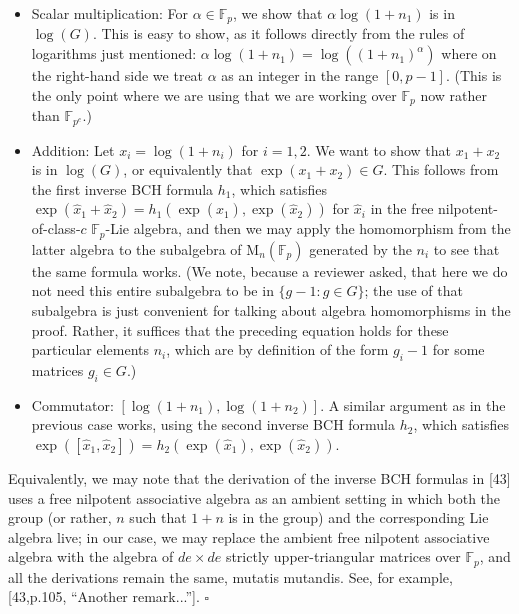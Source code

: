 \documentclass[10pt,a4paper]{article}
\begin{document}
\begin{itemize}
\item Scalar multiplication: For $\alpha\in\mathbb F_p$, we show that $\alpha\log(1+n_1)$ is in $\log(G)$. This is easy to show, as it follows directly from the rules of logarithms just mentioned: $\alpha\log(1+n_1)=\log((1+n_1)^\alpha)$ where on the right-hand side we treat $\alpha$ as an integer in the range $[0,p-1]$. (This is the only point where we are using that we are working over $\mathbb F_p$ now rather than $\mathbb F_{p^e}$.)
\item Addition: Let $x_i=\log(1+n_i)$ for $i=1,2$. We want to show that $x_1+x_2$ is in $\log(G)$, or equivalently that $\exp(x_1+x_2)\in G$. This follows from the first inverse BCH formula $h_1$, which satisfies $\exp(\hat x_1+\hat x_2)=h_1(\exp(\hat x_1),\exp(\hat x_2))$ for $\hat x_i$ in the free nilpotent-of-class-$c$ $\mathbb F_p$-Lie algebra, and then we may apply the homomorphism from the latter algebra to the subalgebra of $\mathrm M_n(\mathbb F_p)$ generated by the $n_i$ to see that the same formula works. (We note, because a reviewer asked, that here we do not need this entire subalgebra to be in $\{g-1:g\in G\}$; the use of that subalgebra is just convenient for talking about algebra homomorphisms in the proof. Rather, it suffices that the preceding equation holds for these particular elements $n_i$, which are by definition of the form $g_i-1$ for some matrices $g_i\in G$.)
\item Commutator: $[\log(1+n_1),\log(1+n_2)]$. A similar argument as in the previous case works, using the second inverse BCH formula $h_2$, which satisfies $\exp([\hat x_1,\hat x_2])=h_2(\exp(\hat x_1),\exp(\hat x_2))$.
\end{itemize}
Equivalently, we may note that the derivation of the inverse BCH formulas in [43] uses a free nilpotent associative algebra as an ambient setting in which both the group (or rather, $n$ such that $1+n$ is in the group) and the corresponding Lie algebra live; in our case, we may replace the ambient free nilpotent associative algebra with the algebra of $de\times de$ strictly upper-triangular matrices over $\mathbb F_p$, and all the derivations remain the same, mutatis mutandis. See, for example, [43,p.105, ``Another remark...'']. \hfill$\square$
\end{document}
